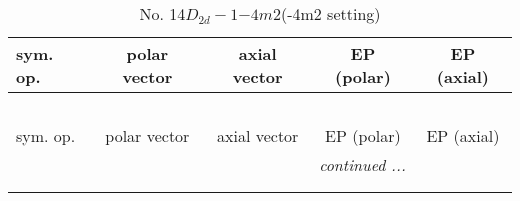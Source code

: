 \documentclass[fleqn,10pt,landscape]{jsarticle}
\begin{document}
\begin{center}
\renewcommand{\arraystretch}{1.3}
\begin{longtable}{lcccc}
\caption{No. 14\quad$D_{2d}-1$\quad$-4m2$\quad(-4m2 setting)\quad[ tetragonal ]}
 \\
 \hline \hline
sym. op. & polar vector & axial vector & EP (polar) & EP (axial) \\ \hline \endfirsthead

\multicolumn{4}{l}{\tablename\ \thetable{}} \\
 \hline \hline
sym. op. & polar vector & axial vector & EP (polar) & EP (axial) \\ \hline \endhead

 \hline \hline
\multicolumn{4}{r}{\footnotesize\it continued ...} \\ \endfoot

 \hline \hline
\multicolumn{4}{r}{} \\ \endlastfoot


\end{longtable}
\end{center}
\end{document}
